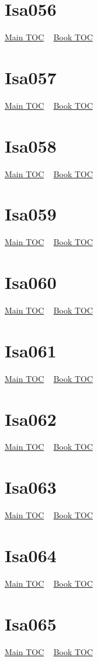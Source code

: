 \documentclass{book}
\begin{document}
  \section{Isa056}\hyperlink{toc}{Main TOC} ~ \hyperref[subsec:Isa]{Book TOC} 
  \section{Isa057}\hyperlink{toc}{Main TOC} ~ \hyperref[subsec:Isa]{Book TOC} 
  \section{Isa058}\hyperlink{toc}{Main TOC} ~ \hyperref[subsec:Isa]{Book TOC} 
  \section{Isa059}\hyperlink{toc}{Main TOC} ~ \hyperref[subsec:Isa]{Book TOC} 
  \section{Isa060}\hyperlink{toc}{Main TOC} ~ \hyperref[subsec:Isa]{Book TOC} 
  \section{Isa061}\hyperlink{toc}{Main TOC} ~ \hyperref[subsec:Isa]{Book TOC} 
  \section{Isa062}\hyperlink{toc}{Main TOC} ~ \hyperref[subsec:Isa]{Book TOC} 
  \section{Isa063}\hyperlink{toc}{Main TOC} ~ \hyperref[subsec:Isa]{Book TOC} 
  \section{Isa064}\hyperlink{toc}{Main TOC} ~ \hyperref[subsec:Isa]{Book TOC} 
  \section{Isa065}\hyperlink{toc}{Main TOC} ~ \hyperref[subsec:Isa]{Book TOC} 
\end{document}
